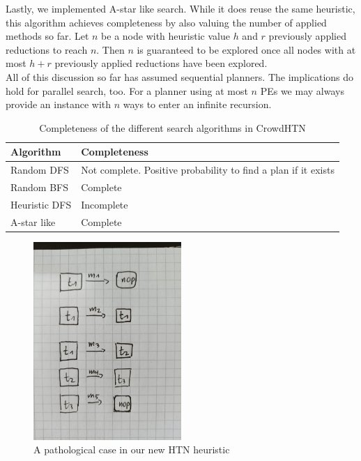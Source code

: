 Lastly, we implemented A-star like search. While it does reuse the same heuristic, this algorithm achieves completeness by also valuing the number of applied methods so far. Let $n$ be a node with heuristic value $h$ and $r$ previously applied reductions to reach $n$. Then $n$ is guaranteed to be explored once all nodes with at most $h + r$ previously applied reductions have been explored. \\
All of this discussion so far has assumed sequential planners. The implications do hold for parallel search, too. For a planner using at most $n$ PEs we may always provide an instance with $n$ ways to enter an infinite recursion.
\begin{table}
	\caption{Completeness of the different search algorithms in CrowdHTN}
	\label{table: search completeness}
	\centering
	\begin{tabular}{| l | l |}
		\hline
		Algorithm & Completeness \\
		\hline
		Random DFS & Not complete. Positive probability to find a plan if it exists \\
		Random BFS & Complete \\
		Heuristic DFS & Incomplete \\
		A-star like & Complete \\
		\hline
	\end{tabular}
\end{table}
\begin{figure}
	\caption{A pathological case in our new HTN heuristic}
	\label{figure: improv heuristic pathological}
	\includegraphics[width=0.5\textwidth]{images/prelim/improv_heuristic_pathological}
\end{figure}


